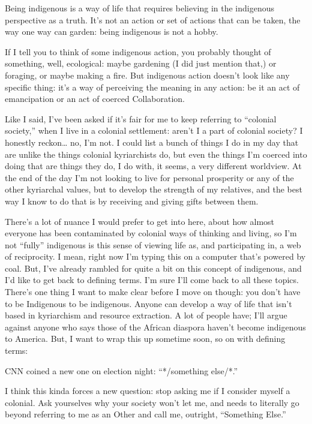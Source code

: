 \documentclass[11pt]{article}
\begin{document}
\begin{itemize}
Being indigenous is a way of life that requires believing in the indigenous perspective as a truth. It’s not an action or set of actions that can be taken, the way one way can garden: being indigenous is not a hobby.

If I tell you to think of some indigenous action, you probably thought of something, well, ecological: maybe gardening (I did just mention that,) or foraging, or maybe making a fire. But indigenous action doesn’t look like any specific thing: it’s a way of perceiving the meaning in any action: be it an act of emancipation or an act of coerced Collaboration.

Like I said, I’ve been asked if it’s fair for me to keep referring to “colonial society,” when I live in a colonial settlement: aren’t I a part of colonial society? I honestly reckon… no, I’m not. I could list a bunch of things I do in my day that are unlike the things colonial kyriarchists do, but even the things I’m coerced into doing that are things they do, I do with, it seems, a very different worldview. At the end of the day I’m not looking to live for personal prosperity or any of the other kyriarchal values, but to develop the strength of my relatives, and the best way I know to do that is by receiving and giving gifts between them.

There’s a lot of nuance I would prefer to get into here, about how almost everyone has been contaminated by colonial ways of thinking and living, so I’m not “fully” indigenous is this sense of viewing life as, and participating in, a web of reciprocity. I mean, right now I’m typing this on a computer that’s powered by coal. But, I’ve already rambled for quite a bit on this concept of indigenous, and I’d like to get back to defining terms. I’m sure I’ll come back to all these topics. There’s one thing I want to make clear before I move on though: you don’t have to be Indigenous to be indigenous. Anyone can develop a way of life that isn’t based in kyriarchism and resource extraction. A lot of people have; I’ll argue against anyone who says those of the African diaspora haven’t become indigenous to America. But, I want to wrap this up sometime soon, so on with defining terms:

CNN coined a new one on election night: “*/something else/*.”

I think this kinda forces a new question: stop asking me if I consider myself a colonial. Ask yourselves why your society won’t let me, and needs to literally go beyond referring to me as an Other and call me, outright, “Something Else.”


\end{itemize}
\end{document}
